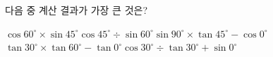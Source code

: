 다음 중 계산 결과가 가장 큰 것은?
\begin{choicesv}{$\cos 60^\circ\times\sin 45^\circ$}{$\cos 45^\circ\div\sin 60^\circ$}{$\sin 90^\circ\times\tan 45^\circ-\cos 0^\circ$}{$\tan 30^\circ\times\tan 60^\circ-\tan 0^\circ$}{$\cos 30^\circ\div\tan 30^\circ+\sin 0^\circ$}\end{choicesv}
